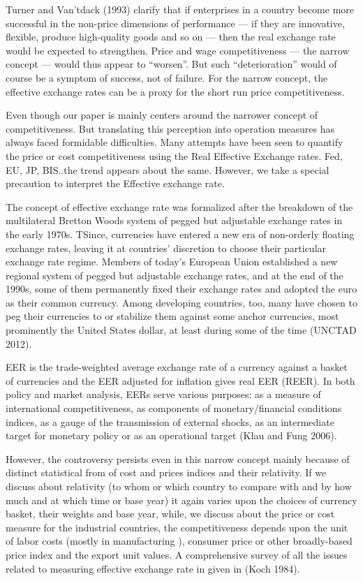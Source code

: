 \documentclass[]{elsarticle} %
\begin{document}
Turner and Van'tdack (1993) clarify that if enterprises in a country
become more successful in the non-price dimensions of performance --- if
they are innovative, flexible, produce high-quality goods and so on ---
then the real exchange rate would be expected to strengthen. Price and
wage competitiveness --- the narrow concept --- would thus appear to
``worsen''. But such ``deterioration'' would of course be a symptom of
success, not of failure. For the narrow concept, the effective exchange
rates can be a proxy for the short run price competitiveness.

Even though our paper is mainly centers around the narrower concept of
competitiveness. But translating this perception into operation measures
has always faced formidable difficulties. Many attempts have been seen
to quantify the price or cost competitiveness using the Real Effective
Exchange rates. Fed, EU, JP, BIS..the trend appears about the same.
However, we take a special precaution to interpret the Effective
exchange rate.

The concept of effective exchange rate was formalized after the
breakdown of the multilateral Bretton Woods system of pegged but
adjustable exchange rates in the early 1970s. TSince, currencies have
entered a new era of non-orderly floating exchange rates, leaving it at
countries' discretion to choose their particular exchange rate regime.
Members of today's European Union established a new regional system of
pegged but adjustable exchange rates, and at the end of the 1990s, some
of them permanently fixed their exchange rates and adopted the euro as
their common currency. Among developing countries, too, many have chosen
to peg their currencies to or stabilize them against some anchor
currencies, most prominently the United States dollar, at least during
some of the time (UNCTAD 2012).

EER is the trade-weighted average exchange rate of a currency against a
basket of currencies and the EER adjusted for inflation gives real EER
(REER). In both policy and market analysis, EERs serve various purposes:
as a measure of international competitiveness, as components of
monetary/financial conditions indices, as a gauge of the transmission of
external shocks, as an intermediate target for monetary policy or as an
operational target (Klau and Fung 2006).

However, the controversy persists even in this narrow concept mainly
because of distinct statistical from of cost and prices indices and
their relativity. If we discuss about relativity (to whom or which
country to compare with and by how much and at which time or base year)
it again varies upon the choices of currency basket, their weights and
base year, while, we discuss about the price or cost measure for the
industrial countries, the competitiveness depends upon the unit of labor
costs (mostly in manufacturing ), consumer price or other broadly-based
price index and the export unit values. A comprehensive survey of all
the issues related to measuring effective exchange rate in given in
(Koch 1984).
\end{document}
